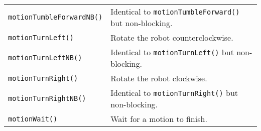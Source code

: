 \begin{table}[!h]
\begin{center}
\begin{tabular}{p{38 mm}p{107 mm}}
\texttt{motionTumbleForwardNB()} \dotfill & Identical to \texttt{motionTumbleForward()} but non-blocking. \\
\texttt{motionTurnLeft()} \dotfill & Rotate the robot counterclockwise. \\
\texttt{motionTurnLeftNB()} \dotfill & Identical to \texttt{motionTurnLeft()} but non-blocking. \\
\texttt{motionTurnRight()} \dotfill & Rotate the robot clockwise. \\
\texttt{motionTurnRightNB()} \dotfill & Identical to \texttt{motionTurnRight()} but non-blocking. \\
\texttt{motionWait()} \dotfill & Wait for a motion to finish. \\
\hline
\end{tabular}
\end{center}
\label{mobilec_api_compound}
\end{table}

\clearpage
\newpage




%



































%








